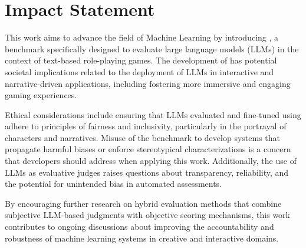 \section*{Impact Statement}

This work aims to advance the field of Machine Learning by introducing \benchmark{}, a benchmark specifically designed to evaluate large language models (LLMs) in the context of text-based role-playing games. The development of \benchmark{} has potential societal implications related to the deployment of LLMs in interactive and narrative-driven applications, including fostering more immersive and engaging gaming experiences.

Ethical considerations include ensuring that LLMs evaluated and fine-tuned using \benchmark{} adhere to principles of fairness and inclusivity, particularly in the portrayal of characters and narratives. Misuse of the benchmark to develop systems that propagate harmful biases or enforce stereotypical characterizations is a concern that developers should address when applying this work. Additionally, the use of LLMs as evaluative judges raises questions about transparency, reliability, and the potential for unintended bias in automated assessments.

By encouraging further research on hybrid evaluation methods that combine subjective LLM-based judgments with objective scoring mechanisms, this work contributes to ongoing discussions about improving the accountability and robustness of machine learning systems in creative and interactive domains.